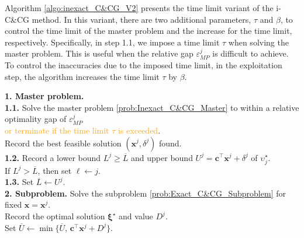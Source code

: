 \documentclass[preprint,review,11pt]{elsarticle}
\theoremstyle{definition}
\theoremstyle{remark}
\newcommand{\tp}{\top}
\newcommand{\epst}{\widetilde{\varepsilon}}
\newcommand{\N}{\mathbb{N}}
\newcommand{\calS}{\mathcal{S}}
\newcommand{\xb}{\pmb{x}}
\newcommand{\cb}{\pmb{c}}
\newcommand{\xib}{\pmb{\xi}}
\newcommand{\Lbar}{\overline{L}}
\newcommand{\Ubar}{\overline{U}}
\begin{document}
Algorithm \ref{algo:inexact_C&CG_V2} presents the time limit variant of the i-C\&CG method. In this variant, there are two additional parameters, $\tau$ and $\beta$, to control the time limit of the master problem and the increase for the time limit, respectively. Specifically, in step 1.1, we impose a time limit $\tau$ when solving the master problem. This is useful when the relative gap $\varepsilon_{MP}^j$ is difficult to achieve. To control the inaccuracies due to the imposed time limit, in the exploitation step, the algorithm increases the time limit $\tau$ by $\beta$. 
%
\IncMargin{1.3em}
\begin{algorithm}[t!] %
{}
\Initialization{$\Lbar \gets0$, $\Ubar\gets\infty$, $\varepsilon \in[0,1]$, $\epst\in(0,\varepsilon/(1+\varepsilon))$,  $\{\varepsilon_{MP}^j \in (0,1)\}_{j\in\N}$, $\alpha \in (0,1)$, $\calS\gets\emptyset$, $j\gets1$, $\ell\gets0$, \textcolor{orange}{$\tau > 0$, $\beta>0$}.} 
\textbf{1. Master problem.} \\
\textbf{\small\hspace{5.3mm}1.1.} Solve the master problem \eqref{prob:Inexact_C&CG_Master} to within a relative optimality gap of $\varepsilon_{MP}^j$ \\\hspace{5.3mm}\textcolor{orange}{or terminate if the time limit $\tau$ is exceeded}.\\ \hspace{5.3mm}Record the best feasible solution $(\xb^j,\delta^j)$ found.  \\
\textbf{\small\hspace{5.3mm}1.2.} Record a lower bound $L^j\geq \Lbar$ and upper bound $U^j= \cb^\tp\xb^j + \delta^j$ of $\upsilon^\star_j$. \\ \hspace{5.3mm}If $L^j> \Lbar$, then set $\ell \leftarrow  j$.  \\
\textbf{\small\hspace{5.3mm}1.3.} Set $\Lbar \leftarrow  U^j$.\\
%
\textbf{2. Subproblem.} Solve the subproblem \eqref{prob:Exact_C&CG_Subproblem} for fixed $\xb=\xb^j$. \\
\hspace{5.3mm}Record the optimal solution $\xib^\star$ and value $D^j$. \\ \hspace{5.3mm}Set $\Ubar \leftarrow  \min\big\{\Ubar,\, \cb^\tp\xb^j +D^j\big\}$.\\


\end{algorithm}
\end{document}
